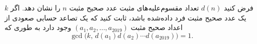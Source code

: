 فرض کنید $d(n)$ تعداد مقسوم‌علیه‌های مثبت عدد صحیح مثبت $n$ را نشان دهد. اگر $k$ یک عدد صحیح مثبت فرد داده‌شده باشد، ثابت کنید که یک تصاعد حسابی صعودی از اعداد صحیح مثبت $(a_1, a_2, \dots, a_{2019})$ وجود دارد به طوری که
\[
\gcd\bigl(k,\, d(a_1)d(a_2)\cdots d(a_{2019})\bigr) = 1.
\]
